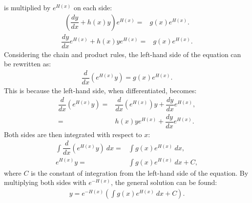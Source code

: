 \begin{prof}{}{}
 is multiplied by $e^{H(x)}$ on each side:
\begin{align*}
\left(\dfrac{dy}{dx}+h(x)y\right)e^{H(x)}=& g(x)e^{H(x)}.
\end{align*}
\begin{align*}
\dfrac{dy}{dx}e^{H(x)}+h(x)ye^{H(x)}=& g(x)e^{H(x)}.
\end{align*}
Considering the chain and product rules, the left-hand side of the equation can be rewritten as:
\begin{align*}
\dfrac{d}{dx}\left(e^{H(x)}y\right)=g(x)e^{H(x)}.
\end{align*}
This is because the left-hand side, when differentiated, becomes:
\begin{align*}
\dfrac{d}{dx}\left(e^{H(x)}y\right)=&\dfrac{d}{dx}\left(e^{H(x)}\right)y+\dfrac{dy}{dx}e^{H(x)}, \\
 =& h(x)ye^{H(x)}+\dfrac{dy}{dx}e^{H(x)}.
\end{align*}
Both sides are then integrated with respect to $x$:
\begin{align*}
\int\dfrac{d}{dx}\left(e^{H(x)}y\right)\ dx=&\int g(x)e^{H(x)}\ dx,
\\
e^{H(x)}y=&\int g(x)e^{H(x)}\ dx+C,
\end{align*}
where $C$ is the constant of integration from the left-hand side of the  equation. By multiplying both sides with $e^{-H(x)}$, the general solution can be found:
\begin{align*}
y=e^{-H(x)}\left(\int g(x)e^{H(x)}\ dx+C\right).
\end{align*}
\end{prof}

